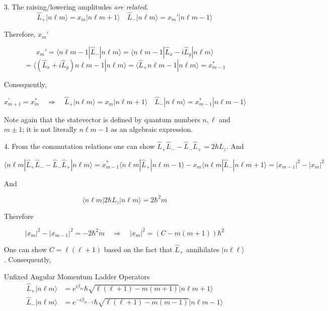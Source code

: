 \begin{itemize}
  \item[3.] The raising/lowering amplitudes \textit{are related}. 
    \[ \hat{L}_+ |n\ell m\rangle = x_m | n \ell m + 1 \rangle \quad \hat{L}_-
    |n\ell m \rangle = x_m' |n \ell m - 1 \rangle\] \vspace{3px}

    Therefore, $x_m'$

    \[ x_m' = \langle n \ell m - 1 | \hat{L}_- | n \ell m \rangle = \langle
    n \ell m - 1 | \hat{L}_x - i \hat{L}_y | n \ell m \rangle \] 
    \[ = \langle ( \hat{L}_x + i \hat{L}_y ) n \ell m - 1 | n \ell m \rangle
    = \langle \hat{L}_+ n \ell m - 1 | n \ell m \rangle = x_{m-1}^* \]
    \vspace{3px}
   
    Consequently, 

    \[
      x_{m+1}^{'} = x_m^* \quad \Rightarrow \quad \hat{L}_+ | n \ell m \rangle
    = x_m | n \ell m + 1 \rangle \quad \hat{L}_-|n \ell m \rangle
    = x_{m-1}^*|n \ell m -1 \rangle
    \] \vspace{3px}
    
    Note again that the statevector is defined by quantum numbers  $n, \ell$
    and  $m \pm 1$; it is not literally $n \ell m - 1$ as an algebraic
    expression. 

  \item[4.] From the commutation relations one can show $\hat{L}_+ \hat{L}_-
    - \hat{L}_- \hat{L}_+ = 2\hbar L_z$. And 

    \[
    \langle n \ell m | \hat{L}_+\hat{L}_- - \hat{L}_- \hat{L}_+ | n \ell
    m \rangle = x_{m-1}^* \langle n \ell m | \hat{L}_+ | n \ell m - 1\rangle
    - x_m \langle n \ell m | \hat{L}_- | n \ell m + 1 \rangle = |x_{m-1}|^2
  - |x_m|^2 
    \] \vspace{3px}
    
    And 

    \[
    \langle n \ell m | 2\hbar L_z | n \ell m \rangle = 2\hbar^2 m
    \] \vspace{3px}
    
    Therefore

    \[
      |x_m|^2 - |x_{m-1}|^2 = -2\hbar^2 m \quad \Rightarrow \quad |x_m|^2 = (C
      - m (m + 1))\hbar^2
    \] \vspace{3px}
    
    One can show $C = \ell(\ell+1)$ based on the fact that $\hat{L}_+$
    annihilates $| n \ell \ell \rangle$. Consequently, 

    \begin{subbox}{Unfixed Angular Momentum Ladder Operators}
      \begin{align} \label{}
        \hat{L}_+ | n \ell m \rangle &= e^{i\beta_m} \hbar \sqrt{\ell(\ell+1)
        - m(m+1)}|n \ell m + 1 \rangle \\ \hat{L}_-|n\ell m\rangle
                                     &= e^{-i\beta_{m-1}} \hbar \sqrt{\ell(\ell + 1 ) - m(m-1)} | n \ell
        m - 1\rangle 
      \end{align}
    \end{subbox}


\end{itemize}
